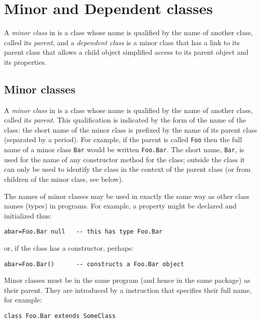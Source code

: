 \chapter{Minor and Dependent classes}\label{refminor}
 
A \emph{minor class} in \nr{} is a class whose name is qualified by
the name of another class, called its \emph{parent}, and a
\emph{dependent class} is a minor class that has a link to its parent
class that allows a child object simplified access to its parent
object and its properties.
\section{Minor classes}\label{refsminorc}
\index{,}
\index{,}
\index{,}
\index{,}
 
A \emph{minor class} in \nr{} is a class whose name is qualified by
the name of another class, called its \emph{parent}.
This qualification is indicated by the form of the name of the class:
the short name of the minor class is prefixed by the name of its parent
class (separated by a period).
For example, if the parent is called \texttt{Foo} then the full name of a
minor class \texttt{Bar} would be written \texttt{Foo.Bar}.
The short name, \texttt{Bar}, is used for the name of any constructor
method for the class; outside the class it can only be used to identify
the class in the context of the parent class (or from children of the
minor class, see below).
 
The names of minor classes may be used in exactly the same way as
other class names (types) in programs.  For example, a property might be
declared and initialized thus:
\begin{lstlisting}
abar=Foo.Bar null   -- this has type Foo.Bar
\end{lstlisting}
or, if the class has a constructor, perhaps:
\begin{lstlisting}
abar=Foo.Bar()      -- constructs a Foo.Bar object
\end{lstlisting}
 
Minor classes must be in the same program (and hence in the same
package) as their parent.  They are introduced by a 
instruction that specifies their full name, for example:
\begin{lstlisting}
class Foo.Bar extends SomeClass
\end{lstlisting}
 
